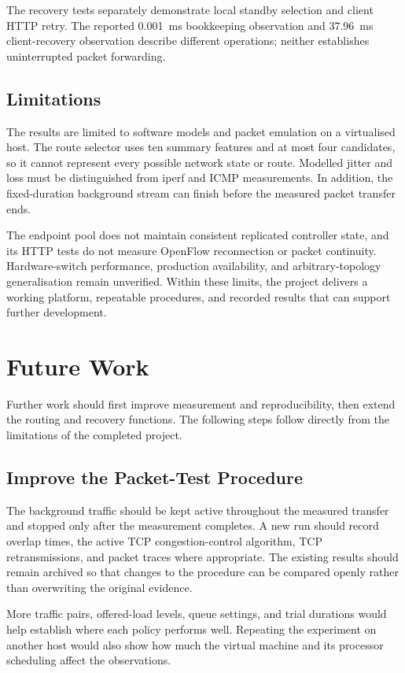 \documentclass[12pt,a4paper,oneside]{report}
\begin{document}
The recovery tests separately demonstrate local standby selection and client HTTP retry. The reported 0.001~ms bookkeeping observation and 37.96~ms client-recovery observation describe different operations; neither establishes uninterrupted packet forwarding.

\section{Limitations}
The results are limited to software models and packet emulation on a virtualised host. The route selector uses ten summary features and at most four candidates, so it cannot represent every possible network state or route. Modelled jitter and loss must be distinguished from iperf and ICMP measurements. In addition, the fixed-duration background stream can finish before the measured packet transfer ends.

The endpoint pool does not maintain consistent replicated controller state, and its HTTP tests do not measure OpenFlow reconnection or packet continuity. Hardware-switch performance, production availability, and arbitrary-topology generalisation remain unverified. Within these limits, the project delivers a working platform, repeatable procedures, and recorded results that can support further development.


\chapter{Future Work}
\label{chap:future}

Further work should first improve measurement and reproducibility, then extend the routing and recovery functions. The following steps follow directly from the limitations of the completed project.

\section{Improve the Packet-Test Procedure}
The background traffic should be kept active throughout the measured transfer and stopped only after the measurement completes. A new run should record overlap times, the active TCP congestion-control algorithm, TCP retransmissions, and packet traces where appropriate. The existing results should remain archived so that changes to the procedure can be compared openly rather than overwriting the original evidence.

More traffic pairs, offered-load levels, queue settings, and trial durations would help establish where each policy performs well. Repeating the experiment on another host would also show how much the virtual machine and its processor scheduling affect the observations.
\end{document}
